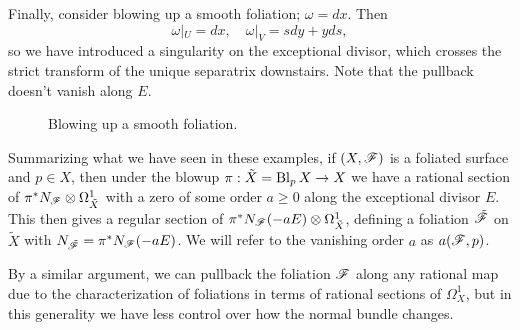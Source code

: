 \begin{example}\label{ex:smooth blowup}
    Finally, consider blowing up a smooth foliation; $\omega=dx$. Then
    \begin{equation*}
        \omega|_U = dx, \quad \omega|_V = sdy+yds,
    \end{equation*}
    so we have introduced a singularity on the exceptional divisor, which
    crosses the strict transform of the unique separatrix downstairs. Note that
    the pullback doesn't vanish along $E$.
    \begin{figure}[H]
        \centering
        \caption{Blowing up a smooth foliation.}
    \end{figure}
\end{example}

\begin{definition}
    Summarizing what we have seen in these examples, if $(X,\mathscr{F})$ is a
    foliated surface and $p\in X$, then under the blowup
    $\pi:\tilde X=\operatorname{Bl}_pX\to X$ we have a rational section of
    $\pi^*N_{\mathscr{F}}\otimes\Omega^1_{\tilde X}$ with a zero of some order $a\ge0$
    along the exceptional divisor $E$. This then gives a regular section of
    $\pi^*N_{\mathscr{F}}(-aE)\otimes\Omega^1_{\tilde X}$, defining a foliation
    $\tilde{\mathscr{F}}$ on $\tilde X$ with $N_{\tilde{\mathscr{F}}}=\pi^*N_{\mathscr{F}}(-aE)$. We
    will refer to the vanishing order $a$ as $a(\mathscr{F},p)$.
\end{definition}

\begin{remark}
    By a similar argument, we can pullback the foliation $\mathscr{F}$ along any
    rational map due to the characterization of foliations in terms of rational
    sections of $\Omega^1_X$, but in this generality we have less control over
    how the normal bundle changes.
\end{remark}

